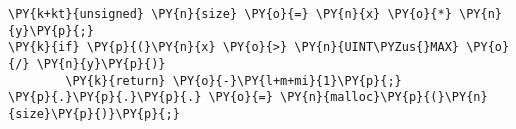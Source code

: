 \begin{Verbatim}[commandchars=\\\{\}]
\PY{k+kt}{unsigned} \PY{n}{size} \PY{o}{=} \PY{n}{x} \PY{o}{*} \PY{n}{y}\PY{p}{;}
\PY{k}{if} \PY{p}{(}\PY{n}{x} \PY{o}{>} \PY{n}{UINT\PYZus{}MAX} \PY{o}{/} \PY{n}{y}\PY{p}{)}
        \PY{k}{return} \PY{o}{-}\PY{l+m+mi}{1}\PY{p}{;}
\PY{p}{.}\PY{p}{.}\PY{p}{.} \PY{o}{=} \PY{n}{malloc}\PY{p}{(}\PY{n}{size}\PY{p}{)}\PY{p}{;}
\end{Verbatim}
